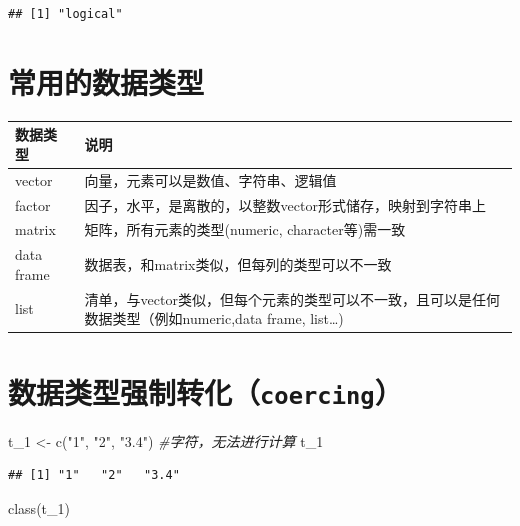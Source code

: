 \documentclass[
]{book}
\newenvironment{Shaded}{\begin{snugshade}}{\end{snugshade}}
\newcommand{\CommentTok}[1]{\textcolor[rgb]{0.56,0.35,0.01}{\textit{#1}}}
\newcommand{\FunctionTok}[1]{\textcolor[rgb]{0.00,0.00,0.00}{#1}}
\newcommand{\NormalTok}[1]{#1}
\newcommand{\OtherTok}[1]{\textcolor[rgb]{0.56,0.35,0.01}{#1}}
\newcommand{\StringTok}[1]{\textcolor[rgb]{0.31,0.60,0.02}{#1}}
\begin{document}
\begin{verbatim}
## [1] "logical"
\end{verbatim}

\hypertarget{ux5e38ux7528ux7684ux6570ux636eux7c7bux578b}{%
\section{常用的数据类型}\label{ux5e38ux7528ux7684ux6570ux636eux7c7bux578b}}

\begin{longtable}[]{@{}ll@{}}
\toprule
数据类型 & 说明 \\
\midrule
\endhead
vector & 向量，元素可以是数值、字符串、逻辑值 \\
factor & 因子，水平，是离散的，以整数vector形式储存，映射到字符串上 \\
matrix & 矩阵，所有元素的类型(numeric, character等)需一致 \\
data frame & 数据表，和matrix类似，但每列的类型可以不一致 \\
list & 清单，与vector类似，但每个元素的类型可以不一致，且可以是任何数据类型（例如numeric,data frame, list\ldots) \\
\bottomrule
\end{longtable}

\hypertarget{ux6570ux636eux7c7bux578bux5f3aux5236ux8f6cux5316coercing}{%
\section{\texorpdfstring{数据类型强制转化（\texttt{coercing}）}{数据类型强制转化（coercing）}}\label{ux6570ux636eux7c7bux578bux5f3aux5236ux8f6cux5316coercing}}

\begin{Shaded}
\begin{Highlighting}[]
\NormalTok{t\_1 }\OtherTok{\textless{}{-}} \FunctionTok{c}\NormalTok{(}\StringTok{"1"}\NormalTok{, }\StringTok{"2"}\NormalTok{, }\StringTok{"3.4"}\NormalTok{) }\CommentTok{\#字符，无法进行计算}
\NormalTok{t\_1}
\end{Highlighting}
\end{Shaded}

\begin{verbatim}
## [1] "1"   "2"   "3.4"
\end{verbatim}

\begin{Shaded}
\begin{Highlighting}[]
\FunctionTok{class}\NormalTok{(t\_1)}
\end{Highlighting}
\end{Shaded}
\end{document}

